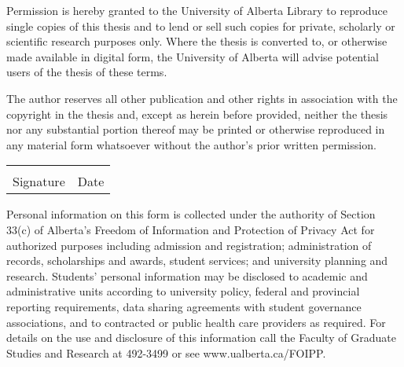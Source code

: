 \documentclass[10pt]{report}
\begin{document}
{\small
Permission is hereby granted to the University of Alberta Library to
reproduce single copies of this thesis and to lend or sell such copies
for private, scholarly or scientific research purposes only. Where the
thesis is converted to, or otherwise made available in digital form,
the University of Alberta will advise potential users of the thesis of
these terms.  

The author reserves all other publication and other rights in
association with the copyright in the thesis and, except as herein
before provided, neither the thesis nor any substantial portion
thereof may be printed or otherwise reproduced in any material form
whatsoever without the author's prior written permission.
}

\vspace{1cm}
\begin{center}
  \begin{tabular}{p{} p{}}
    \underline{\hspace{5cm}} &  \underline{\hspace{3cm}}\\
    Signature & Date \\
  \end{tabular}
\end{center}


\noindent
\parbox{\textwidth}
{\tiny Personal information on this form is collected under the
  authority of Section 33(c) of Alberta’s Freedom of Information and
  Protection of Privacy Act for authorized purposes including
  admission and registration; administration of records, scholarships
  and awards, student services; and university planning and
  research. Students’ personal information may be disclosed to
  academic and administrative units according to university policy,
  federal and provincial reporting requirements, data sharing
  agreements with student governance associations, and to contracted
  or public health care providers as required. For details on the use
  and disclosure of this information call the Faculty of Graduate
  Studies and Research at 492-3499 or see www.ualberta.ca/FOIPP. 
}
\end{document}
